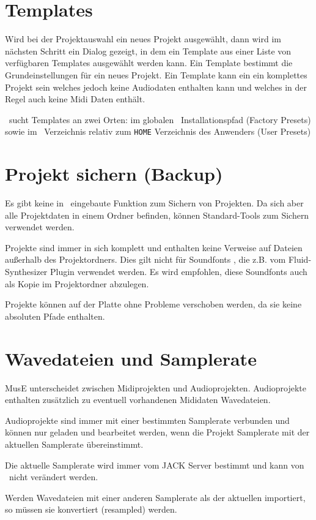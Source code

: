    \section{Templates}

      Wird bei der Projektauswahl ein neues Projekt ausgewählt, dann
      wird im nächsten Schritt ein Dialog gezeigt, in dem ein Template
      aus einer Liste von verfügbaren Templates ausgewählt werden kann.
      Ein Template bestimmt die Grundeinstellungen für ein neues
      Projekt. Ein Template kann ein ein komplettes Projekt sein welches
      jedoch keine Audiodaten enthalten kann und welches in der Regel
      auch keine Midi Daten enthält.

      \M\ sucht Templates an zwei Orten:
      im globalen \M\ Installationspfad (Factory Presets) sowie im 
      \M\ Verzeichnis relativ zum {\tt HOME} Verzeichnis des
      Anwenders (User Presets)

   \section{Projekt sichern (Backup)}

      Es gibt keine in \M\ eingebaute Funktion zum Sichern von Projekten.
      Da sich aber alle Projektdaten in einem Ordner befinden,
      können Standard-Tools zum Sichern verwendet werden.

      Projekte sind immer in sich komplett und enthalten keine Verweise
      auf Dateien außerhalb des Projektordners. Dies gilt nicht
      für Soundfonts , die z.B. vom Fluid-Synthesizer 
      Plugin verwendet werden. 
      Es wird empfohlen, diese Soundfonts 
      auch als Kopie im Projektordner abzulegen.

      Projekte können auf der Platte ohne Probleme verschoben werden,
      da sie keine absoluten Pfade enthalten.

   \section{Wavedateien und Samplerate}

      MusE unterscheidet zwischen Midiprojekten und Audioprojekten.
      Audioprojekte enthalten zusätzlich zu eventuell vorhandenen
      Mididaten Wavedateien.
      
      Audioprojekte sind immer mit einer bestimmten Samplerate
      verbunden und können nur geladen und bearbeitet werden, wenn
      die Projekt Samplerate mit der aktuellen Samplerate übereinstimmt.

      Die aktuelle Samplerate wird immer vom JACK Server bestimmt und
      kann von \M\ nicht verändert werden.

      Werden Wavedateien mit einer anderen Samplerate als der aktuellen
      importiert, so müssen sie konvertiert (resampled) 
      werden.

